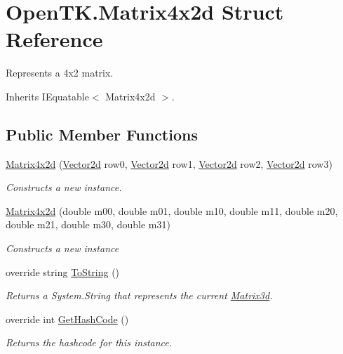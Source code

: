 \hypertarget{struct_open_t_k_1_1_matrix4x2d}{\section{Open\-T\-K.\-Matrix4x2d Struct Reference}
\label{struct_open_t_k_1_1_matrix4x2d}
}


Represents a 4x2 matrix.  




Inherits I\-Equatable$<$ Matrix4x2d $>$.

\subsection*{Public Member Functions}
\begin{DoxyCompactItemize}
\item 
\hyperlink{struct_open_t_k_1_1_matrix4x2d_a4c118d0ffd8c9d8c661ee3497705ad11}{Matrix4x2d} (\hyperlink{struct_open_t_k_1_1_vector2d}{Vector2d} row0, \hyperlink{struct_open_t_k_1_1_vector2d}{Vector2d} row1, \hyperlink{struct_open_t_k_1_1_vector2d}{Vector2d} row2, \hyperlink{struct_open_t_k_1_1_vector2d}{Vector2d} row3)
\begin{DoxyCompactList}\small\item\em Constructs a new instance. \end{DoxyCompactList}\item 
\hyperlink{struct_open_t_k_1_1_matrix4x2d_ab9055d33488b3859f4171b02a2a39ee4}{Matrix4x2d} (double m00, double m01, double m10, double m11, double m20, double m21, double m30, double m31)
\begin{DoxyCompactList}\small\item\em Constructs a new instance \end{DoxyCompactList}\item 
override string \hyperlink{struct_open_t_k_1_1_matrix4x2d_a4661aeec1c7c3e392cba30712274bffb}{To\-String} ()
\begin{DoxyCompactList}\small\item\em Returns a System.\-String that represents the current \hyperlink{struct_open_t_k_1_1_matrix3d}{Matrix3d}. \end{DoxyCompactList}\item 
override int \hyperlink{struct_open_t_k_1_1_matrix4x2d_a0e3ebbee088e8ec35a197622968d9c01}{Get\-Hash\-Code} ()
\begin{DoxyCompactList}\small\item\em Returns the hashcode for this instance. \end{DoxyCompactList}\item 

\end{DoxyCompactItemize}
